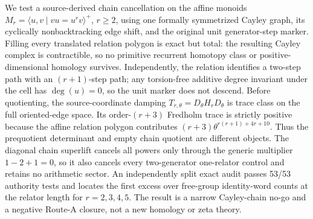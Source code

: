 We test a source-derived chain cancellation on the affine monoids
$M_r=\langle u,v\mid vu=u^rv\rangle^+$, $r\ge2$, using one formally
symmetrized Cayley graph, its cyclically nonbacktracking edge shift, and the
original unit generator-step marker.  Filling every translated relation
polygon is exact but total: the resulting Cayley complex is contractible, so
no primitive recurrent homotopy class or positive-dimensional homology
survives.  Independently, the relation identifies a two-step path with an
$(r+1)$-step path; any torsion-free additive degree invariant under the cell
has $\deg(u)=0$, so the unit marker does not descend.  Before quotienting, the
source-coordinate damping
$T_{r,\theta}=D_\theta H_rD_\theta$ is trace class on the full oriented-edge
space.  Its order-$(r+3)$ Fredholm trace is strictly positive because the
affine relation polygon contributes
$(r+3)\theta^{r(r+1)+4r+10}$.  Thus the prequotient determinant and empty
chain quotient are different objects.  The diagonal chain superlift cancels
all powers only through the generic multiplier $1-2+1=0$, so it also cancels
every two-generator one-relator control and retains no arithmetic sector.  An
independently split exact audit passes 53/53 authority tests and locates the
first excess over free-group identity-word counts at the relator length for
$r=2,3,4,5$.  The result is a narrow Cayley-chain no-go and a negative Route-A
closure, not a new homology or zeta theory.
